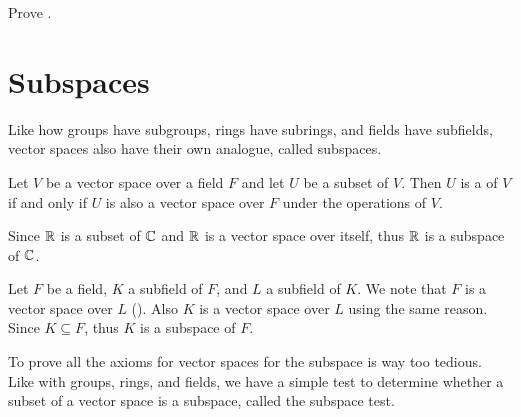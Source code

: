 \begin{exercise}\label{exercise-zero-vector-scaled-by-constant-is-zero-vector}
    Prove .
\end{exercise}

\section{Subspaces}
Like how groups have subgroups, rings have subrings, and fields have subfields, vector spaces also have their own analogue, called subspaces.

\begin{definition}
    Let $V$ be a vector space over a field $F$ and let $U$ be a subset of $V$. Then $U$ is a  of $V$ if and only if $U$ is also a vector space over $F$ under the operations of $V$.
\end{definition}

\begin{example}
    Since $\mathbb{R}$ is a subset of $\mathbb{C}$ and $\mathbb{R}$ is a vector space over itself, thus $\mathbb{R}$ is a subspace of $\mathbb{C}$.
\end{example}

\begin{example}
    Let $F$ be a field, $K$ a subfield of $F$, and $L$ a subfield of $K$. We note that $F$ is a vector space over $L$ (). Also $K$ is a vector space over $L$ using the same reason. Since $K \subseteq F$, thus $K$ is a subspace of $F$.
\end{example}

To prove all the axioms for vector spaces for the subspace is way too tedious. Like with groups, rings, and fields, we have a simple test to determine whether a subset of a vector space is a subspace, called the subspace test.

